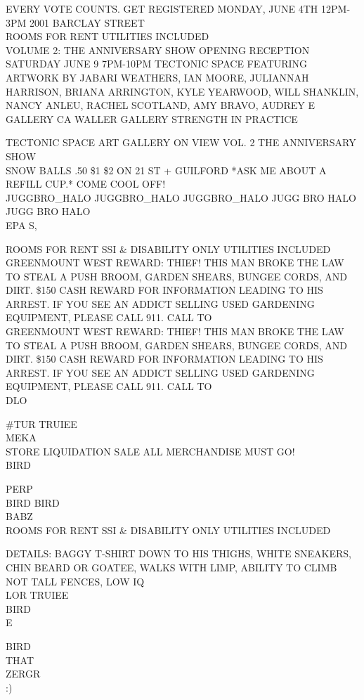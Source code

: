 \documentclass[10pt,letterpaper]{article}
\begin{document}
EVERY VOTE COUNTS.  GET REGISTERED MONDAY, JUNE 4TH 12PM{-}3PM 2001 BARCLAY STREET\\
ROOMS FOR RENT  UTILITIES INCLUDED\\
VOLUME 2: THE ANNIVERSARY SHOW OPENING RECEPTION SATURDAY JUNE 9 7PM{-}10PM TECTONIC SPACE FEATURING ARTWORK BY JABARI WEATHERS, IAN MOORE, JULIANNAH HARRISON, BRIANA ARRINGTON, KYLE YEARWOOD, WILL SHANKLIN, NANCY ANLEU, RACHEL SCOTLAND, AMY BRAVO, AUDREY E\\
GALLERY CA WALLER GALLERY STRENGTH IN PRACTICE

TECTONIC SPACE ART GALLERY ON VIEW VOL. 2 THE ANNIVERSARY SHOW\\
SNOW BALLS .50 \$1 \$2 ON 21 ST + GUILFORD *ASK ME ABOUT A REFILL CUP.* COME COOL OFF!\\
JUGGBRO\_HALO JUGGBRO\_HALO JUGGBRO\_HALO JUGG BRO HALO JUGG BRO HALO\\
EPA S,

ROOMS FOR RENT SSI \& DISABILITY ONLY UTILITIES INCLUDED\\
GREENMOUNT WEST REWARD: THIEF!  THIS MAN BROKE THE LAW TO STEAL A PUSH BROOM, GARDEN SHEARS, BUNGEE CORDS, AND DIRT.  \$150 CASH REWARD FOR INFORMATION LEADING TO HIS ARREST.  IF YOU SEE AN ADDICT SELLING USED GARDENING EQUIPMENT, PLEASE CALL 911.  CALL TO\\
GREENMOUNT WEST REWARD: THIEF!  THIS MAN BROKE THE LAW TO STEAL A PUSH BROOM, GARDEN SHEARS, BUNGEE CORDS, AND DIRT.  \$150 CASH REWARD FOR INFORMATION LEADING TO HIS ARREST.  IF YOU SEE AN ADDICT SELLING USED GARDENING EQUIPMENT, PLEASE CALL 911.  CALL TO\\
DLO

\#TUR TRUIEE\\
MEKA\\
STORE LIQUIDATION SALE ALL MERCHANDISE MUST GO!\\
BIRD

PERP\\
BIRD BIRD\\
BABZ\\
ROOMS FOR RENT SSI \& DISABILITY ONLY UTILITIES INCLUDED

DETAILS: BAGGY T{-}SHIRT DOWN TO HIS THIGHS, WHITE SNEAKERS, CHIN BEARD OR GOATEE, WALKS WITH LIMP, ABILITY TO CLIMB NOT TALL FENCES, LOW IQ\\
LOR TRUIEE\\
BIRD\\
E

BIRD\\
THAT\\
ZERGR\\
:)
\end{document}

